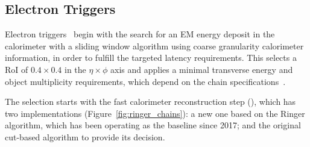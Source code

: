 \subsection{Electron Triggers}\label{ssec:egamma_trigger}


Electron triggers~\cite{aad2020performance} begin with
the search for an EM energy deposit in the calorimeter with a \licalo{} sliding
window algorithm using coarse granularity calorimeter information, in order to
fulfill the targeted latency requirements. This selects a RoI of $0.4\times 0.4$
in the $\eta\times\phi$ axis and applies a minimal transverse energy and object
multiplicity requirements, which depend on the chain
specifications~\cite{TRIG-2016-01}.
 
The \hlt{} selection starts with the fast calorimeter reconstruction
step (\fastcalo), which has two implementations
(Figure~\ref{fig:ringer_chains}): a new one based on the Ringer algorithm, which
has been operating as the baseline since 2017; and the original cut-based
algorithm to provide its decision.%








